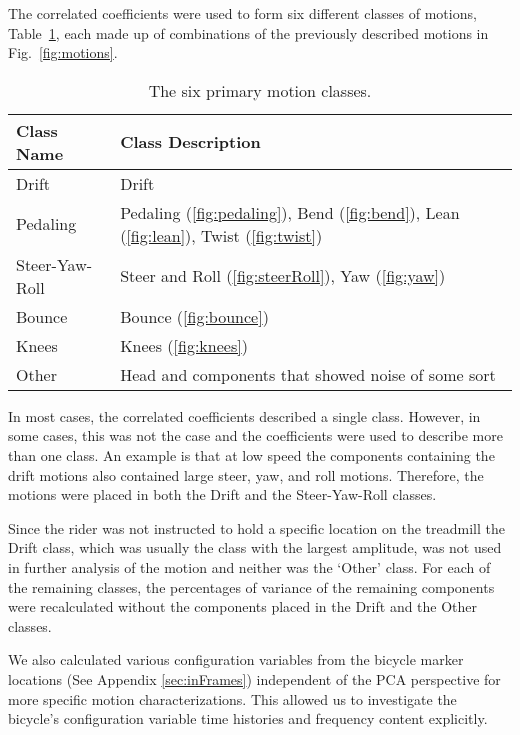 \documentclass[smallextended]{svjour3}     %
\begin{document}
The correlated coefficients were used to form six different classes of motions, Table~\ref{tab:MotionClasses},
each made up of combinations of the previously described motions in
Fig.~\ref{fig:motions}.
\begin{table}[tbp]
    \caption{The six primary motion classes.}
    \label{tab:MotionClasses}
    \centering
    \begin{tabular}[]{ll}
        Class Name & Class Description\\
        \hline
        Drift & Drift\\
        Pedaling & Pedaling (\ref{fig:pedaling}), Bend (\ref{fig:bend}), Lean
            (\ref{fig:lean}), Twist (\ref{fig:twist})\\
        Steer-Yaw-Roll & Steer and Roll (\ref{fig:steerRoll}), Yaw
            (\ref{fig:yaw})\\
        Bounce & Bounce (\ref{fig:bounce})\\
        Knees & Knees (\ref{fig:knees})\\
        Other & Head and components that showed noise of some
        sort
    \end{tabular}
\end{table}
In most cases, the correlated coefficients described a single class. However, in
some cases, this was not the case and the coefficients were used to describe
more than one class. An example is that at low speed the components containing
the drift motions also contained large steer, yaw, and roll motions. Therefore,
the motions were placed in both the Drift and the Steer-Yaw-Roll classes.

Since the rider was not instructed to hold a specific location on the treadmill
the Drift class, which was usually the class with the largest amplitude, was
not used in further analysis of the motion and neither was the `Other' class.
For each of the remaining classes, the percentages of variance of the remaining
components were recalculated without the components placed in the Drift and the
Other classes.

We also calculated various configuration variables from the bicycle marker locations
(See Appendix \ref{sec:inFrames}) independent of the PCA perspective for more
specific motion characterizations. This allowed us to investigate the bicycle's
configuration variable time histories and frequency content explicitly.
\end{document}
